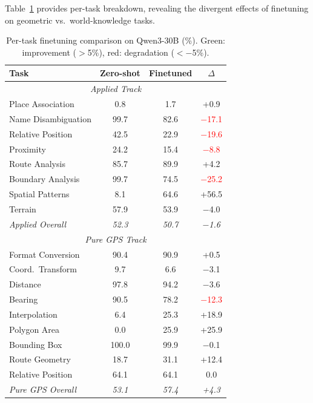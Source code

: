 Table~\ref{tab:finetuning_per_task} provides per-task breakdown, revealing the divergent effects of finetuning on geometric vs.\ world-knowledge tasks.

\begin{table}[htbp]
\centering
\caption{Per-task finetuning comparison on Qwen3-30B (\%). Green: improvement ($>$5\%), red: degradation ($<$$-$5\%).}
\label{tab:finetuning_per_task}
\small
\begin{tabular}{lccc}
\toprule
\textbf{Task} & \textbf{Zero-shot} & \textbf{Finetuned} & \textbf{$\Delta$} \\
\midrule
\multicolumn{4}{c}{\textit{Applied Track}} \\
\midrule
Place Association & 0.8 & 1.7 & +0.9 \\
Name Disambiguation & 99.7 & 82.6 & \textcolor{red}{$-$17.1} \\
Relative Position & 42.5 & 22.9 & \textcolor{red}{$-$19.6} \\
Proximity & 24.2 & 15.4 & \textcolor{red}{$-$8.8} \\
Route Analysis & 85.7 & 89.9 & +4.2 \\
Boundary Analysis & 99.7 & 74.5 & \textcolor{red}{$-$25.2} \\
Spatial Patterns & 8.1 & 64.6 & \textcolor{green!60!black}{+56.5} \\
Terrain & 57.9 & 53.9 & $-$4.0 \\
\midrule
\textit{Applied Overall} & \textit{52.3} & \textit{50.7} & \textit{$-$1.6} \\
\midrule
\multicolumn{4}{c}{\textit{Pure GPS Track}} \\
\midrule
Format Conversion & 90.4 & 90.9 & +0.5 \\
Coord.\ Transform & 9.7 & 6.6 & $-$3.1 \\
Distance & 97.8 & 94.2 & $-$3.6 \\
Bearing & 90.5 & 78.2 & \textcolor{red}{$-$12.3} \\
Interpolation & 6.4 & 25.3 & \textcolor{green!60!black}{+18.9} \\
Polygon Area & 0.0 & 25.9 & \textcolor{green!60!black}{+25.9} \\
Bounding Box & 100.0 & 99.9 & $-$0.1 \\
Route Geometry & 18.7 & 31.1 & \textcolor{green!60!black}{+12.4} \\
Relative Position & 64.1 & 64.1 & 0.0 \\
\midrule
\textit{Pure GPS Overall} & \textit{53.1} & \textit{57.4} & \textit{+4.3} \\
\bottomrule
\end{tabular}
\end{table}

